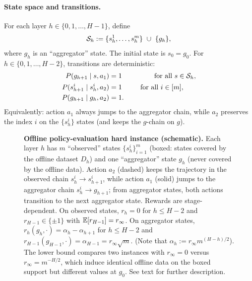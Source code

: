 \paragraph{State space and transitions.}
For each layer $h\in\{0,1,\dots,H-1\}$, define
\[
\Scal_h := \{s_h^1,\dots,s_h^m\}\ \cup\ \{g_h\},
\]
where $g_h$ is an ``aggregator'' state.  The initial state is $s_0=g_0$.
For $h\in\{0,1,\dots,H-2\}$, transitions are deterministic:
\begin{align*}
P(g_{h+1}\mid s,a_1) &= 1
\qquad\qquad\ \ \text{for all } s\in\mathcal{S}_h,\\
P(s_{h+1}^i\mid s_h^i,a_2) &= 1
\qquad\ \ \text{for all } i\in[m],\\
P(g_{h+1}\mid g_h,a_2) &= 1.
\end{align*}
Equivalently: action $a_1$ always jumps to the aggregator chain, while $a_2$
preserves the index $i$ on the $\{s_h^i\}$ states (and keeps the $g$-chain on $g$).


\begin{figure}[t!]
\centering

\caption{\textbf{Offline policy-evaluation hard instance (schematic).}
Each layer $h$ has $m$ ``observed'' states $\{s_h^i\}_{i=1}^m$ (boxed: states covered by the offline dataset $D_h$)
and one ``aggregator'' state $g_h$ (never covered by the offline data).
Action $a_2$ (dashed) keeps the trajectory in the observed chain $s_h^i\to s_{h+1}^i$,
while action $a_1$ (solid) jumps to the aggregator chain $s_h^i\to g_{h+1}$; from aggregator states, both actions transition to the next aggregator state.
Rewards are stage-dependent. On observed states, $r_h=0$ for $h\le H-2$ and $r_{H-1}\in\{\pm1\}$ with $\mathbb{E}[r_{H-1}]=r_\infty$.
On aggregator states, $r_h(g_h,\cdot)=\alpha_h-\alpha_{h+1}$ for $h\le H-2$ and $r_{H-1}(g_{H-1},\cdot)=\alpha_{H-1}=r_\infty\sqrt m$.
(Note that $\alpha_h:=r_\infty m^{(H-h)/2}$).
The lower bound compares two instances with $r_\infty=0$ versus
$r_\infty=m^{-H/2}$, which induce identical offline data on the boxed
support but different values at $g_0$. See text for further description.}
\label{fig:offline_pe_hard_instance_clean}
\end{figure}

